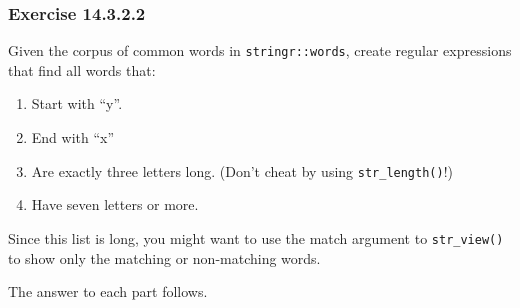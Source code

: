 \documentclass[]{book}
\providecommand{\tightlist}{%
  \setlength{\itemsep}{0pt}\setlength{\parskip}{0pt}}
\theoremstyle{plain}
\theoremstyle{remark}
\theoremstyle{definition}
\theoremstyle{definition}
\theoremstyle{definition}
\theoremstyle{remark}
\begin{document}
\hypertarget{exercise-14.3.2.2}{%
\subsubsection*{\texorpdfstring{Exercise
{14.3.2.2}}{Exercise 14.3.2.2}}\label{exercise-14.3.2.2}}

Given the corpus of common words in \texttt{stringr::words}, create
regular expressions that find all words that:

\begin{enumerate}
\def\labelenumi{\arabic{enumi}.}
\tightlist
\item
  Start with ``y''.
\item
  End with ``x''
\item
  Are exactly three letters long. (Don't cheat by using
  \texttt{str\_length()}!)
\item
  Have seven letters or more.
\end{enumerate}

Since this list is long, you might want to use the match argument to
\texttt{str\_view()} to show only the matching or non-matching words.

The answer to each part follows.
\end{document}
